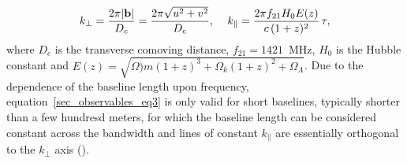 \begin{equation}
k_\perp = \frac{2 \pi |{\bf b}|}{D_c} = \frac{2 \pi \sqrt{u^2 + v^2}}{D_c}, \,\,\,\,\,\,\,    k_\parallel = \frac{2 \pi f_{21} H_0 E(z)}{c \, (1 + z)^2} \, \tau,
\label{sec_observables_eq4}
\end{equation}
where $D_c$ is the transverse comoving distance, $f_{21} = 1421$~MHz, $H_0$ is the Hubble constant and $E(z) = \sqrt{\Omega)m (1+z)^3 + \Omega_k (1+z)^2 + \Omega_\Lambda}$. Due to the dependence of the baseline length upon frequency, equation~\ref{sec_observables_eq3} is only valid for short baselines, typically shorter than a few hundresd meters, for which the baseline length can be considered constant across the bandwidth and lines of constant $k_\parallel$ are essentially orthogonal to the $k_\perp$ axis (\cite{parsons12b}).

